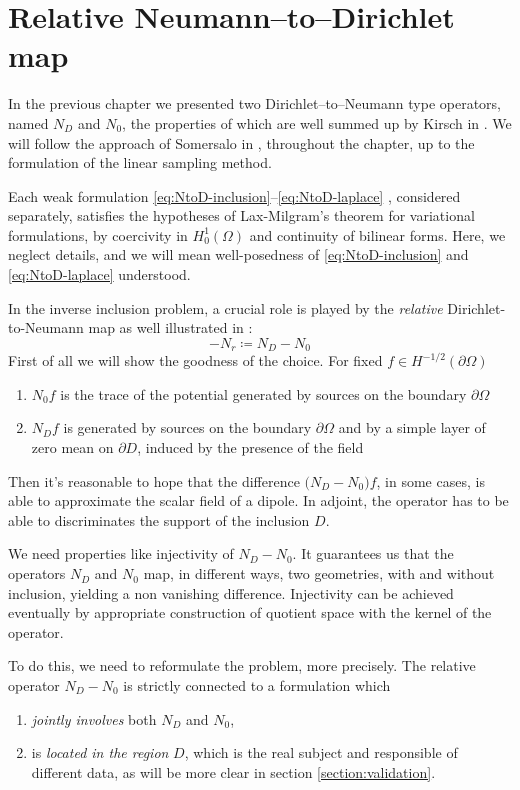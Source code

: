 \documentclass[10pt, a4paper, twoside, openright]{book}
\theoremstyle{definition}
\theoremstyle{plain}
\theoremstyle{plain}
\theoremstyle{plain}
\theoremstyle{plain}
\theoremstyle{plain}
\theoremstyle{plain}
\theoremstyle{plain}
\theoremstyle{plain}
\begin{document}
\section{Relative Neumann--to--Dirichlet map}
In the previous chapter we presented two Dirichlet--to--Neumann type operators, named ${N_D}$ and ${N_0}$, 
the properties of which are well summed up by Kirsch in \cite{kirsch:book}. 
We will follow the approach of Somersalo in \cite{somersalo:preprint}, throughout the chapter, 
up to the formulation of the linear sampling method.
\par
Each weak formulation \eqref{eq:NtoD-inclusion}--\eqref{eq:NtoD-laplace} , considered separately, satisfies the hypotheses of Lax-Milgram's theorem for 
variational formulations, by coercivity in $H^1_0(\Omega)$ and continuity of bilinear forms. 
Here, we neglect details, and we will mean well-posedness of \eqref{eq:NtoD-inclusion} and \eqref{eq:NtoD-laplace} 
understood.
\par
In the inverse inclusion problem, a crucial role is played by the 
\textit{relative} Dirichlet-to-Neumann map as well illustrated in \cite{somersalo:preprint}:
\begin{equation}
 -{N_r} \coloneqq {N_D} - {N_0}
\end{equation}
First of all we will show the goodness of the choice. For fixed $f\in  H^{-1/2}(\partial \Omega)$
\begin{enumerate}
 \item ${N_0} f$ is the trace of the potential generated by sources on the boundary $\partial \Omega$ 
 \item ${N_D} f$ is generated by sources on the boundary $\partial \Omega$ and by a simple layer of 
 zero mean on $\partial D$, induced by the presence of the field
\end{enumerate}
Then it's reasonable to hope that the difference $\bigl({N_D}-{N_0}\bigr)f$, in some cases, 
is able to approximate the scalar field of a dipole.
In adjoint, the operator has to be able to discriminates the support of the inclusion $D$.
\par
We need properties like injectivity of ${N_D} - {N_0}$. It guarantees us that the operators 
${N_D}$ and ${N_0}$ map, in different ways, two geometries, with and without inclusion, 
yielding a non vanishing difference.
Injectivity can be achieved eventually by appropriate construction of quotient space with the kernel of the operator.
\par
To do this, we need to reformulate the problem, more precisely.
The relative operator ${N_D} - {N_0}$ is strictly connected to a formulation which
\begin{enumerate}
 \item \emph{jointly involves} both ${N_D}$ and ${N_0}$,
 \item is \emph{located in the region} $D$, which is the real subject and responsible of different data, 
 as will be more clear in section \ref{section:validation}.
\end{enumerate}
\end{document}
